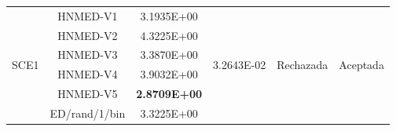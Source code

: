 \begin{table}
{\begin{tabular}{lccccc}
			\multirow{6}{*}{SCE1} & HNMED-V1      & 3.1935E+00                   & \multirow{6}{*}{ 3.2643E-02 }  & \multirow{6}{*}{Rechazada}& \multirow{6}{*}{Aceptada} \\
			& HNMED-V2      & 4.3225E+00                   &                    &                          &                            \\
			& HNMED-V3      & 3.3870E+00                   &                    &                          &                            \\
			& HNMED-V4      & 3.9032E+00                   &                    &                          &                            \\
			& HNMED-V5      & \textbf{2.8709E+00 }         &                    &                          &                            \\
			& ED/rand/1/bin &3.3225E+00 &                  &                    &                            \\
			
		\end{tabular}
	}
\end{table}




